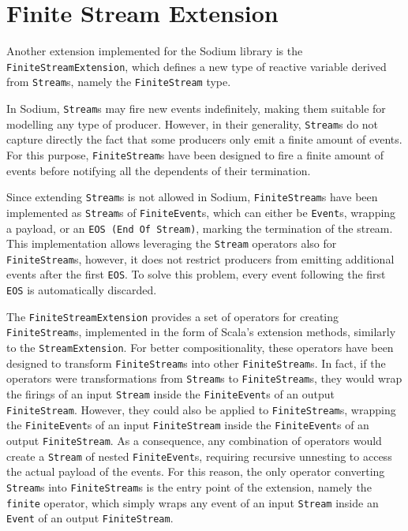 
\section{Finite Stream Extension}
\label{section:implementation:finite-stream-extension}

Another extension implemented for the Sodium library is the
\texttt{FiniteStreamExten\-sion}, which defines a new type of reactive variable
derived from \texttt{Stream}s, namely the \texttt{Finite\-Stream} type.

In Sodium, \texttt{Stream}s may fire new events indefinitely, making them
suitable for modelling any type of producer. However, in their generality,
\texttt{Stream}s do not capture directly the fact that some producers only emit
a finite amount of events. For this purpose, \texttt{FiniteStream}s have been
designed to fire a finite amount of events before notifying all the dependents
of their termination.

Since extending \texttt{Stream}s is not allowed in Sodium,
\texttt{FiniteStream}s have been implemented as \texttt{Stream}s of
\texttt{FiniteEvent}s, which can either be \texttt{Event}s, wrapping a payload,
or an \texttt{EOS (End Of Stream)}, marking the termination of the stream. This
implementation allows leveraging the \texttt{Stream} operators also for
\texttt{FiniteStream}s, however, it does not restrict producers from emitting
additional events after the first \texttt{EOS}. To solve this problem, every
event following the first \texttt{EOS} is automatically discarded.

The \texttt{FiniteStreamExtension} provides a set of operators for creating
\texttt{Finite\-Stream}s, implemented in the form of Scala's extension methods,
similarly to the \texttt{StreamExten\-sion}. For better compositionality, these
operators have been designed to transform \texttt{FiniteStream}s into other
\texttt{FiniteStream}s. In fact, if the operators were transformations from
\texttt{Stream}s to \texttt{FiniteStream}s, they would wrap the firings of an
input \texttt{Stream} inside the \texttt{FiniteEvent}s of an output
\texttt{FiniteStream}. However, they could also be applied to
\texttt{FiniteStream}s, wrapping the \texttt{Finite\-Event}s of an input
\texttt{FiniteStream} inside the \texttt{FiniteEvent}s of an output
\texttt{Finite\-Stream}. As a consequence, any combination of operators would
create a \texttt{Stream} of nested \texttt{FiniteEvent}s, requiring recursive
unnesting to access the actual payload of the events. For this reason, the only
operator converting \texttt{Stream}s into \texttt{FiniteStream}s is the entry
point of the extension, namely the \texttt{finite} operator, which simply wraps
any event of an input \texttt{Stream} inside an \texttt{Event} of an output
\texttt{FiniteStream}.

